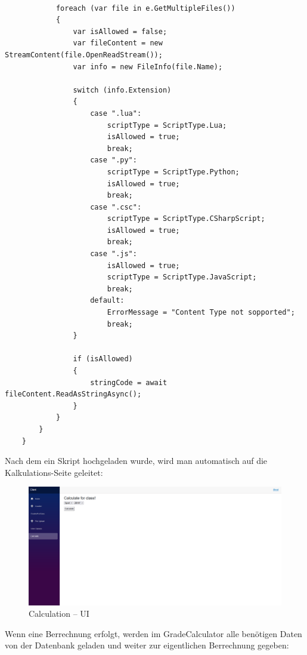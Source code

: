 \begin{lstlisting}[language={[Sharp]C}, caption=Code for FileUpload, label=lst:imp:fu]
    
            foreach (var file in e.GetMultipleFiles())
            {
                var isAllowed = false;
                var fileContent = new StreamContent(file.OpenReadStream());
                var info = new FileInfo(file.Name);
    
                switch (info.Extension)
                {
                    case ".lua":
                        scriptType = ScriptType.Lua;
                        isAllowed = true;
                        break;
                    case ".py":
                        scriptType = ScriptType.Python;
                        isAllowed = true;
                        break;
                    case ".csc":
                        scriptType = ScriptType.CSharpScript;
                        isAllowed = true;
                        break;
                    case ".js":
                        isAllowed = true;
                        scriptType = ScriptType.JavaScript;
                        break;
                    default:
                        ErrorMessage = "Content Type not sopported";
                        break;
                }
    
                if (isAllowed)
                {
                    stringCode = await fileContent.ReadAsStringAsync();
                }
            }
        }
    }
\end{lstlisting}
\newpage
Nach dem ein Skript hochgeladen wurde, wird man automatisch auf die Kalkulations-Seite geleitet:

\begin{figure}[H]
    \centering
    \includegraphics[scale=0.5]{pics/CalculationUI.png}
    \caption{Calculation -- UI}
    \label{fig:impl:CalculationUI}
\end{figure}

Wenn eine Berrechnung erfolgt, werden im GradeCalculator alle benötigen Daten von der Datenbank geladen und weiter zur eigentlichen Berrechnung gegeben:


